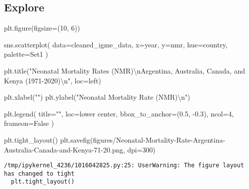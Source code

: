 \documentclass[
  letterpaper,
  DIV=11,
  numbers=noendperiod]{scrreprt}
\newenvironment{Shaded}{\begin{snugshade}}{\end{snugshade}}
\newcommand{\CharTok}[1]{\textcolor[rgb]{0.13,0.47,0.30}{#1}}
\newcommand{\DecValTok}[1]{\textcolor[rgb]{0.68,0.00,0.00}{#1}}
\newcommand{\FloatTok}[1]{\textcolor[rgb]{0.68,0.00,0.00}{#1}}
\newcommand{\NormalTok}[1]{\textcolor[rgb]{0.00,0.23,0.31}{#1}}
\newcommand{\OperatorTok}[1]{\textcolor[rgb]{0.37,0.37,0.37}{#1}}
\newcommand{\StringTok}[1]{\textcolor[rgb]{0.13,0.47,0.30}{#1}}
\newcommand{\VariableTok}[1]{\textcolor[rgb]{0.07,0.07,0.07}{#1}}
\begin{document}
\hypertarget{explore-2}{%
\subsection{Explore}\label{explore-2}}

\begin{Shaded}
\begin{Highlighting}[]
\NormalTok{plt.figure(figsize}\OperatorTok{=}\NormalTok{(}\DecValTok{10}\NormalTok{, }\DecValTok{6}\NormalTok{))}

\NormalTok{sns.scatterplot(}
\NormalTok{    data}\OperatorTok{=}\NormalTok{cleaned\_igme\_data, }
\NormalTok{    x}\OperatorTok{=}\StringTok{\textquotesingle{}year\textquotesingle{}}\NormalTok{, }
\NormalTok{    y}\OperatorTok{=}\StringTok{\textquotesingle{}nmr\textquotesingle{}}\NormalTok{, }
\NormalTok{    hue}\OperatorTok{=}\StringTok{\textquotesingle{}country\textquotesingle{}}\NormalTok{, }
\NormalTok{    palette}\OperatorTok{=}\StringTok{\textquotesingle{}Set1\textquotesingle{}}
\NormalTok{)}

\NormalTok{plt.title(}\StringTok{"Neonatal Mortality Rates (NMR)}\CharTok{\textbackslash{}n}\StringTok{Argentina, Australia, Canada, and Kenya (1971{-}2020)}\CharTok{\textbackslash{}n}\StringTok{"}\NormalTok{, loc}\OperatorTok{=}\StringTok{\textquotesingle{}left\textquotesingle{}}\NormalTok{)}

\NormalTok{plt.xlabel(}\StringTok{""}\NormalTok{)}
\NormalTok{plt.ylabel(}\StringTok{"Neonatal Mortality Rate (NMR)}\CharTok{\textbackslash{}n}\StringTok{"}\NormalTok{)}

\NormalTok{plt.legend(}
\NormalTok{    title}\OperatorTok{=}\StringTok{""}\NormalTok{, }
\NormalTok{    loc}\OperatorTok{=}\StringTok{\textquotesingle{}lower center\textquotesingle{}}\NormalTok{, }
\NormalTok{    bbox\_to\_anchor}\OperatorTok{=}\NormalTok{(}\FloatTok{0.5}\NormalTok{, }
    \OperatorTok{{-}}\FloatTok{0.3}\NormalTok{), }
\NormalTok{    ncol}\OperatorTok{=}\DecValTok{4}\NormalTok{, }
\NormalTok{    frameon}\OperatorTok{=}\VariableTok{False}
\NormalTok{)}

\NormalTok{plt.tight\_layout()}
\NormalTok{plt.savefig(}\StringTok{\textquotesingle{}figures/Neonatal{-}Mortality{-}Rate{-}Argentina{-}Australia{-}Canada{-}and{-}Kenya{-}71{-}20.png\textquotesingle{}}\NormalTok{, dpi}\OperatorTok{=}\DecValTok{300}\NormalTok{)}
\end{Highlighting}
\end{Shaded}

\begin{verbatim}
/tmp/ipykernel_4236/1016042825.py:25: UserWarning: The figure layout has changed to tight
  plt.tight_layout()
\end{verbatim}
\end{document}

